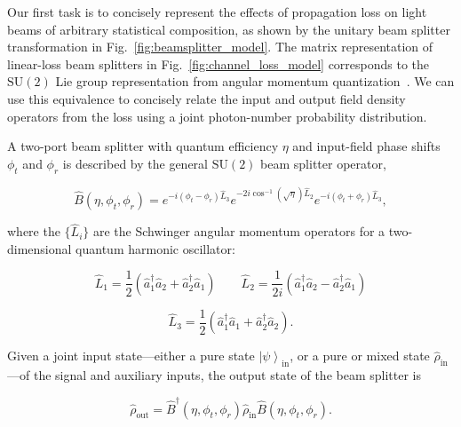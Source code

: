 \documentclass[aps,twocolumn,secnumarabic,amsmath,amssymb,pra,groupedaddress,
showpacs, showkeys]{revtex4-1}
\newcommand{\ket}[1]{\left|#1\right\rangle}
\newcommand{\pna}[1]{\left(#1\right)}
\newcommand{\eqn}[1]{
\begin{equation}
	#1
\end{equation}
}
\begin{document}
Our first task is to concisely represent the effects of propagation loss on
light beams of arbitrary statistical composition, as shown by the unitary beam
splitter transformation in Fig.~\ref{fig:beamsplitter_model}.  The matrix
representation of linear-loss beam splitters in
Fig.~\ref{fig:channel_loss_model} corresponds to the $\textrm{SU}\pna{2}$ Lie
group representation from angular momentum
quantization~\cite{PhysRevA.40.1371}. We can use this equivalence to concisely
relate the input and output field density operators from the loss using a joint
photon-number probability distribution.

A two-port beam splitter with quantum efficiency $\eta$ and input-field phase
shifts $\phi_t$ and $\phi_r$ is described by the general $\textrm{SU}\pna{2}$
beam splitter operator,
\eqn{
\hat{B}\pna{\eta,\phi_t,\phi_r}=e^{-i\pna{\phi_t-\phi_r}\hat{L}_3}e^{-2i\cos^{-1}\pna{\sqrt{\eta}}\hat{L}_2}e^{-i\pna{\phi_t+\phi_r}\hat{L}_3},\label{eq:bs_operator_def}
}
where the $\{\hat{L}_i\}$ are the Schwinger angular momentum operators for a
two-dimensional quantum harmonic oscillator:
\eqn{
\hat{L}_1 = \frac{1}{2}\pna{\hat{a}_1^{\dagger}\hat{a}_2+\hat{a}^{\dagger}_2\hat{a}_1} \qquad 
\hat{L}_2 =
\frac{1}{2i}\pna{\hat{a}_1^{\dagger}\hat{a}_2-\hat{a}^{\dagger}_2\hat{a}_1}
\nonumber }
\eqn{
\hat{L}_3 = \frac{1}{2}\pna{\hat{a}_1^{\dagger}\hat{a}_1+\hat{a}^{\dagger}_2\hat{a}_2}.
}
Given a joint input state---either a pure state $\ket{\psi}_{\textrm{in}}$, or
a pure or mixed state $\hat{\rho}_{\textrm{in}}$---of the signal and auxiliary
inputs, the output state of the beam splitter is
\eqn{
\hat{\rho}_{\textrm{out}}=\hat{B}^{\dagger}\pna{\eta,\phi_t,\phi_r}\hat{\rho}_{\textrm{in}}\hat{B}\pna{\eta,\phi_t,\phi_r}.\label{eq:beamsplitter_trans}}
\end{document}
